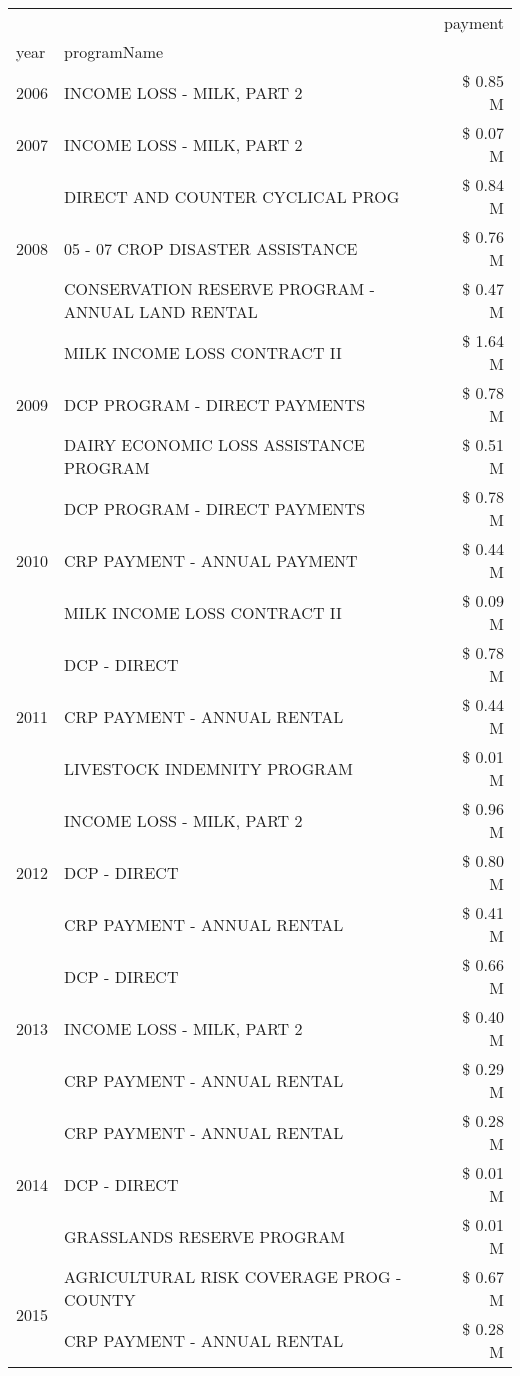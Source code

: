 \begin{tabular}{llr}
\toprule
 &  & payment \\
year & programName &  \\
\midrule
2006 & INCOME LOSS - MILK, PART 2 & \$ 0.85 M \\
\cline{1-3}
2007 & INCOME LOSS - MILK, PART 2 & \$ 0.07 M \\
\cline{1-3}
\multirow[t]{3}{*}{2008} & DIRECT AND COUNTER CYCLICAL PROG & \$ 0.84 M \\
 & 05 - 07 CROP DISASTER ASSISTANCE & \$ 0.76 M \\
 & CONSERVATION RESERVE PROGRAM - ANNUAL LAND RENTAL & \$ 0.47 M \\
\cline{1-3}
\multirow[t]{3}{*}{2009} & MILK INCOME LOSS CONTRACT II & \$ 1.64 M \\
 & DCP PROGRAM - DIRECT PAYMENTS & \$ 0.78 M \\
 & DAIRY ECONOMIC LOSS ASSISTANCE PROGRAM & \$ 0.51 M \\
\cline{1-3}
\multirow[t]{3}{*}{2010} & DCP PROGRAM - DIRECT PAYMENTS & \$ 0.78 M \\
 & CRP PAYMENT - ANNUAL PAYMENT & \$ 0.44 M \\
 & MILK INCOME LOSS CONTRACT II & \$ 0.09 M \\
\cline{1-3}
\multirow[t]{3}{*}{2011} & DCP - DIRECT & \$ 0.78 M \\
 & CRP PAYMENT - ANNUAL RENTAL & \$ 0.44 M \\
 & LIVESTOCK INDEMNITY PROGRAM & \$ 0.01 M \\
\cline{1-3}
\multirow[t]{3}{*}{2012} & INCOME LOSS - MILK, PART 2 & \$ 0.96 M \\
 & DCP - DIRECT & \$ 0.80 M \\
 & CRP PAYMENT - ANNUAL RENTAL & \$ 0.41 M \\
\cline{1-3}
\multirow[t]{3}{*}{2013} & DCP - DIRECT & \$ 0.66 M \\
 & INCOME LOSS - MILK, PART 2 & \$ 0.40 M \\
 & CRP PAYMENT - ANNUAL RENTAL & \$ 0.29 M \\
\cline{1-3}
\multirow[t]{3}{*}{2014} & CRP PAYMENT - ANNUAL RENTAL & \$ 0.28 M \\
 & DCP - DIRECT & \$ 0.01 M \\
 & GRASSLANDS RESERVE PROGRAM & \$ 0.01 M \\
\cline{1-3}
\multirow[t]{3}{*}{2015} & AGRICULTURAL RISK COVERAGE PROG - COUNTY & \$ 0.67 M \\
 & CRP PAYMENT - ANNUAL RENTAL & \$ 0.28 M \\

\end{tabular}
